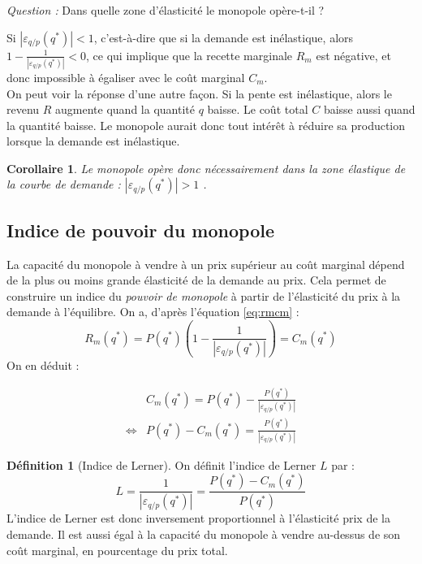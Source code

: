 \documentclass[
]{book}
\newtheorem{corollary}{Corollaire}[chapter]
\theoremstyle{definition}
\newtheorem{definition}{Définition}[chapter]
\theoremstyle{definition}
\theoremstyle{definition}
\theoremstyle{definition}
\theoremstyle{remark}
\begin{document}
\emph{Question :} Dans quelle zone d'élasticité le monopole opère-t-il ?

Si \(\left|\varepsilon_{q/p}(q^*)\right|<1\), c'est-à-dire que si la demande est inélastique, alors \(1 - \frac{1}{\left|\varepsilon_{q/p}(q^*)\right|} <0\), ce qui implique que la recette marginale \(R_m\) est négative, et donc impossible à égaliser avec le coût marginal \(C_m\).\\
On peut voir la réponse d'une autre façon.
Si la pente est inélastique, alors le revenu \(R\) augmente quand la quantité \(q\) baisse.
Le coût total \(C\) baisse aussi quand la quantité baisse.
Le monopole aurait donc tout intérêt à réduire sa production lorsque la demande est inélastique.

\begin{corollary}
Le monopole opère donc nécessairement dans la zone élastique de la courbe de demande : \(\left|\varepsilon_{q/p}(q^*)\right|>1\) .
\end{corollary}

\hypertarget{indice-de-pouvoir-du-monopole}{%
\subsection{Indice de pouvoir du monopole}\label{indice-de-pouvoir-du-monopole}}

La capacité du monopole à vendre à un prix supérieur au coût marginal dépend de la plus ou moins grande élasticité de la demande au prix.
Cela permet de construire un indice du \emph{pouvoir de monopole} à partir de l'élasticité du prix à la demande à l'équilibre.
On a, d'après l'équation \eqref{eq:rmcm} :
\[
R_m(q^*) = P(q^*)\left(1 - \frac{1}{|\varepsilon_{q/p}(q^*)|}\right) = C_m(q^*) 
\]
On en déduit :

\[\begin{array}{rl}
& C_m(q^*) = P(q^*) - \frac{P(q^*)}{|\varepsilon_{q/p}(q^*)|}\\
\Leftrightarrow & P(q^*) - C_m(q^*) = \frac{P(q^*)}{|\varepsilon_{q/p}(q^*)|}
\end{array}
\]

\begin{definition}[Indice de Lerner]
\protect\hypertarget{def:Lerner}{}\label{def:Lerner}On définit l'indice de Lerner \(L\) par :
\[
L=\frac{1}{|\varepsilon_{q/p}(q^*)|} = \frac{P(q^*) - C_m(q^*)}{P(q^*)} \label{eq:Lerner}
\]
L'indice de Lerner est donc inversement proportionnel à l'élasticité prix de la demande.
Il est aussi égal à la capacité du monopole à vendre au-dessus de son coût marginal, en pourcentage du prix total.
\end{definition}
\end{document}

